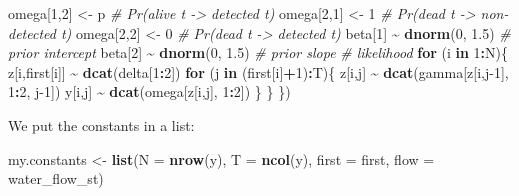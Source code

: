 \documentclass[
  12pt,
]{krantz}
\newenvironment{Shaded}{\begin{snugshade}}{\end{snugshade}}
\newcommand{\AttributeTok}[1]{\textcolor[rgb]{0.13,0.29,0.53}{#1}}
\newcommand{\CommentTok}[1]{\textcolor[rgb]{0.56,0.35,0.01}{\textit{#1}}}
\newcommand{\ControlFlowTok}[1]{\textcolor[rgb]{0.13,0.29,0.53}{\textbf{#1}}}
\newcommand{\DecValTok}[1]{\textcolor[rgb]{0.00,0.00,0.81}{#1}}
\newcommand{\FloatTok}[1]{\textcolor[rgb]{0.00,0.00,0.81}{#1}}
\newcommand{\FunctionTok}[1]{\textcolor[rgb]{0.13,0.29,0.53}{\textbf{#1}}}
\newcommand{\NormalTok}[1]{#1}
\newcommand{\OtherTok}[1]{\textcolor[rgb]{0.56,0.35,0.01}{#1}}
\newcommand{\SpecialCharTok}[1]{\textcolor[rgb]{0.81,0.36,0.00}{\textbf{#1}}}
\begin{document}
\begin{Shaded}
\begin{Highlighting}[]
\NormalTok{  omega[}\DecValTok{1}\NormalTok{,}\DecValTok{2}\NormalTok{] }\OtherTok{\textless{}{-}}\NormalTok{ p        }\CommentTok{\# Pr(alive t {-}\textgreater{} detected t)}
\NormalTok{  omega[}\DecValTok{2}\NormalTok{,}\DecValTok{1}\NormalTok{] }\OtherTok{\textless{}{-}} \DecValTok{1}        \CommentTok{\# Pr(dead t {-}\textgreater{} non{-}detected t)}
\NormalTok{  omega[}\DecValTok{2}\NormalTok{,}\DecValTok{2}\NormalTok{] }\OtherTok{\textless{}{-}} \DecValTok{0}        \CommentTok{\# Pr(dead t {-}\textgreater{} detected t)}
\NormalTok{  beta[}\DecValTok{1}\NormalTok{] }\SpecialCharTok{\textasciitilde{}} \FunctionTok{dnorm}\NormalTok{(}\DecValTok{0}\NormalTok{, }\FloatTok{1.5}\NormalTok{) }\CommentTok{\# prior intercept}
\NormalTok{  beta[}\DecValTok{2}\NormalTok{] }\SpecialCharTok{\textasciitilde{}} \FunctionTok{dnorm}\NormalTok{(}\DecValTok{0}\NormalTok{, }\FloatTok{1.5}\NormalTok{) }\CommentTok{\# prior slope}
  \CommentTok{\# likelihood}
  \ControlFlowTok{for}\NormalTok{ (i }\ControlFlowTok{in} \DecValTok{1}\SpecialCharTok{:}\NormalTok{N)\{}
\NormalTok{    z[i,first[i]] }\SpecialCharTok{\textasciitilde{}} \FunctionTok{dcat}\NormalTok{(delta[}\DecValTok{1}\SpecialCharTok{:}\DecValTok{2}\NormalTok{])}
    \ControlFlowTok{for}\NormalTok{ (j }\ControlFlowTok{in}\NormalTok{ (first[i]}\SpecialCharTok{+}\DecValTok{1}\NormalTok{)}\SpecialCharTok{:}\NormalTok{T)\{}
\NormalTok{      z[i,j] }\SpecialCharTok{\textasciitilde{}} \FunctionTok{dcat}\NormalTok{(gamma[z[i,j}\DecValTok{{-}1}\NormalTok{], }\DecValTok{1}\SpecialCharTok{:}\DecValTok{2}\NormalTok{, j}\DecValTok{{-}1}\NormalTok{])}
\NormalTok{      y[i,j] }\SpecialCharTok{\textasciitilde{}} \FunctionTok{dcat}\NormalTok{(omega[z[i,j], }\DecValTok{1}\SpecialCharTok{:}\DecValTok{2}\NormalTok{])}
\NormalTok{    \}}
\NormalTok{  \}}
\NormalTok{\})}
\end{Highlighting}
\end{Shaded}

We put the constants in a list:

\begin{Shaded}
\begin{Highlighting}[]
\NormalTok{my.constants }\OtherTok{\textless{}{-}} \FunctionTok{list}\NormalTok{(}\AttributeTok{N =} \FunctionTok{nrow}\NormalTok{(y),}
                     \AttributeTok{T =} \FunctionTok{ncol}\NormalTok{(y),}
                     \AttributeTok{first =}\NormalTok{ first,}
                     \AttributeTok{flow =}\NormalTok{ water\_flow\_st)}
\end{Highlighting}
\end{Shaded}
\end{document}
